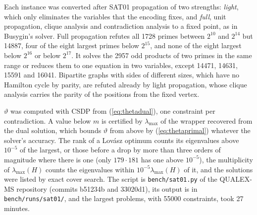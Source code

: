 \documentclass[11pt]{article}
\theoremstyle{definition}
\theoremstyle{remark}
\newcommand{\lmax}{\lambda_{\max}}
\begin{document}
Each instance was converted after SAT01 propagation of two strengths: {\em
light}, which only eliminates the variables that the encoding fixes, and
{\em full}, unit propagation, clique analysis and contradiction analysis to a
fixed point, as in Busygin's solver. Full propagation refutes all 1728 primes
between $2^{10}$ and $2^{14}$ but 14887, four of the eight largest primes
below $2^{15}$, and none of the eight largest below $2^{16}$ or below
$2^{17}$. It solves the 2957 odd products of two primes in the same range or
reduces them to one equation in two variables, except 14471, 14631, 15591
and 16041. Bipartite graphs with sides of different sizes, which have no
Hamilton cycle by parity, are refuted already by light propagation, whose
clique analysis carries the parity of the positions from the fixed vertex.

$\vartheta$ was computed with CSDP from (\ref{eq:thetadual}), one constraint
per contradiction. A value below $m$ is certified by $\lmax$ of the wrapper
recovered from the dual solution, which bounds $\vartheta$ from above by
(\ref{eq:thetaprimal}) whatever the solver's accuracy. The rank of a
Lov\'asz optimum counts its eigenvalues above $10^{-5}$ of the largest, or
those before a drop by more than three orders of magnitude where there is one
(only $179\cdot181$ has one above $10^{-5}$), the multiplicity of $\lmax(H)$
counts the eigenvalues within $10^{-5}\lmax(H)$ of it, and the solutions were
listed by exact cover search. The script is
\texttt{bench/sat01.py} of the QUALEX-MS repository (commits b51234b and
33020d1), its output is in \texttt{bench/runs/sat01/}, and the largest
problems, with 55000 constraints, took 27 minutes.
\end{document}
